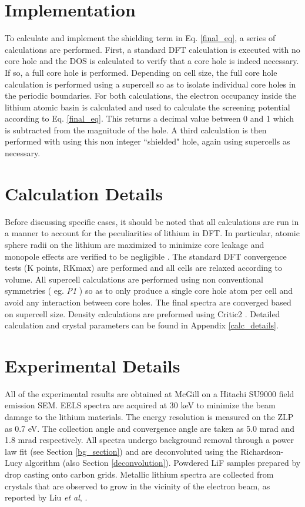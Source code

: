 \section{Implementation} \label{implementation}
To calculate and implement the shielding term in Eq. \ref{final_eq}, a series of calculations are performed.  First, a standard DFT calculation is executed with no core hole and the DOS is calculated to verify that a core hole is indeed necessary.  If so, a full core hole is performed. Depending on cell size, the full core hole calculation is performed using a supercell so as to isolate individual core holes in the periodic boundaries. For both calculations, the electron occupancy inside the lithium atomic basin is calculated and used to calculate the screening potential according to Eq. \ref{final_eq}.  This returns a decimal value between 0 and 1 which is subtracted from the magnitude of the hole.  A third calculation is then performed with using this non integer ``shielded" hole, again using supercells as necessary.  

\section{Calculation Details} \label{calc_section}
Before discussing specific cases, it should be noted that all calculations are run in a manner to account for the peculiarities of lithium in DFT. In particular, atomic sphere radii on the lithium are maximized to minimize core leakage and monopole effects are verified to be negligible \cite{mauchamp_ab_2006}.  The standard DFT convergence tests (K points, RKmax) are performed and all cells are relaxed according to volume.  All supercell calculations are performed using non conventional symmetries ( eg. \textit{P1} ) so as to only produce a single core hole atom per cell and avoid any interaction between core holes. The final spectra are  converged based on supercell size.  Density calculations are preformed using Critic2 \cite{critic2}.   Detailed calculation and crystal parameters can be found in Appendix \ref{calc_details}. \\


\section{Experimental Details} \label{expt_methods}
All of the experimental results are obtained at McGill on a Hitachi SU9000 field emission SEM.  EELS spectra are acquired at 30 keV to minimize the beam damage to the lithium materials. The energy resolution is measured on the ZLP as 0.7 eV.  The collection angle and convergence angle are taken as 5.0 mrad and 1.8 mrad respectively.  All spectra undergo  background removal through a power law fit (see Section \ref{bg_section}) and are deconvoluted using the Richardson-Lucy algorithm (also Section \ref{deconvolution}).   Powdered LiF samples prepared by drop casting onto carbon grids.  Metallic lithium spectra are collected from crystals that are observed to grow in the vicinity of the electron beam, as reported by Liu \textit{et al}, \cite{liu_preparation_1986, egerton_electron_1987}.
